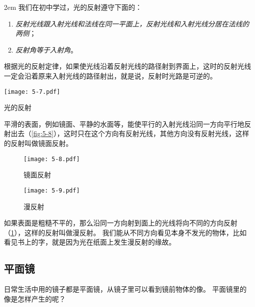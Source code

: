 \medskip\noindent
\begin{minipage}{0.65\linewidth}\parindent2em
我们在初中学过，光的反射遵守下面的：

\begin{enumerate}
  \item \emph{反射光线跟入射光线和法线在同一平面上，反射光线和入射光线分居在法线的两侧}；
  \item \emph{反射角等于入射角}。
\end{enumerate}

根据光的反射定律，如果使光线沿着反射光线的路径射到界面上，这时的反射光线一定会沿着原来入射光线的路径射出，就是说，反射时光路是可逆的。
\end{minipage}\hfill
\begin{minipage}{0.3\linewidth}\centering
  \begin{figurehere}
    \texttt{[image: 5-7.pdf]}
    \caption{光的反射}\label{fig:5-7}
  \end{figurehere}
\end{minipage}

\medskip
平滑的表面，例如镜面、平静的水面等，能使平行的入射光线沿同一方向平行地反射出去（\cref{fig:5-8}），这时只在这个方向有反射光线，其他方向没有反射光线，这样的反射叫做镜面反射。
\begin{figure}
  
  \begin{minipage}[b]{0.48\linewidth}\centering
    \texttt{[image: 5-8.pdf]}
    \caption{镜面反射}\label{fig:5-8}
  \end{minipage}
  \begin{minipage}[b]{0.48\linewidth}\centering
    \texttt{[image: 5-9.pdf]}
    \caption{漫反射}\label{fig:5-9}
  \end{minipage}
\end{figure}

如果表面是粗糙不平的，那么沿同一方向射到面上的光线将向不同的方向反射（\cref{fig:5-9}），这样的反射叫做漫反射。
我们能从不同方向看见本身不发光的物体，比如看见书上的字，就是因为光在纸面上发生漫反射的缘故。

\subsection{平面镜}

日常生活中用的镜子都是平面镜，从镜子里可以看到镜前物体的像。
平面镜里的像是怎样产生的呢？

